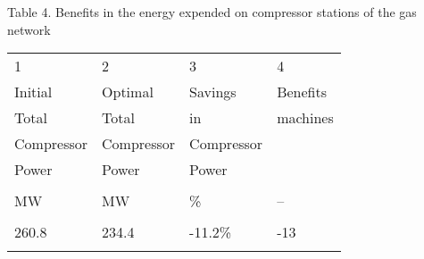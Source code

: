 \documentclass{article}
\begin{document}
\bigskip


\bigskip

\newpage

\bigskip

Table 4. Benefits in the energy expended on compressor stations of the gas
network

\bigskip

\begin{tabular}{llll}
1 & 2 & 3 & 4 \\ 
Initial & Optimal & Savings & Benefits \\ 
Total & Total & in & machines \\ 
Compressor & Compressor & Compressor &  \\ 
Power & Power & Power &  \\ 
&  &  &  \\ 
MW & MW & \% & -- \\ 
&  &  &  \\ 
260.8 & 234.4 & -11.2\% & -13 \\ 
&  &  & 
\end{tabular}

\bigskip
\end{document}
